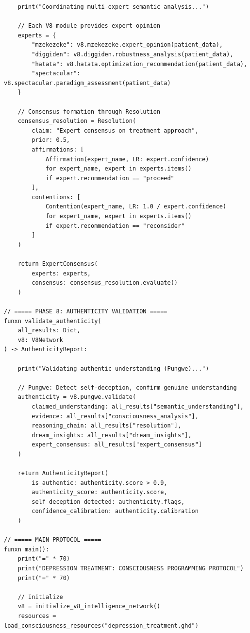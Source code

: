 \begin{verbatim}
    print("Coordinating multi-expert semantic analysis...")
    
    // Each V8 module provides expert opinion
    experts = {
        "mzekezeke": v8.mzekezeke.expert_opinion(patient_data),
        "diggiden": v8.diggiden.robustness_analysis(patient_data),
        "hatata": v8.hatata.optimization_recommendation(patient_data),
        "spectacular": v8.spectacular.paradigm_assessment(patient_data)
    }
    
    // Consensus formation through Resolution
    consensus_resolution = Resolution(
        claim: "Expert consensus on treatment approach",
        prior: 0.5,
        affirmations: [
            Affirmation(expert_name, LR: expert.confidence)
            for expert_name, expert in experts.items()
            if expert.recommendation == "proceed"
        ],
        contentions: [
            Contention(expert_name, LR: 1.0 / expert.confidence)
            for expert_name, expert in experts.items()
            if expert.recommendation == "reconsider"
        ]
    )
    
    return ExpertConsensus(
        experts: experts,
        consensus: consensus_resolution.evaluate()
    )

// ===== PHASE 8: AUTHENTICITY VALIDATION =====
funxn validate_authenticity(
    all_results: Dict,
    v8: V8Network
) -> AuthenticityReport:
    
    print("Validating authentic understanding (Pungwe)...")
    
    // Pungwe: Detect self-deception, confirm genuine understanding
    authenticity = v8.pungwe.validate(
        claimed_understanding: all_results["semantic_understanding"],
        evidence: all_results["consciousness_analysis"],
        reasoning_chain: all_results["resolution"],
        dream_insights: all_results["dream_insights"],
        expert_consensus: all_results["expert_consensus"]
    )
    
    return AuthenticityReport(
        is_authentic: authenticity.score > 0.9,
        authenticity_score: authenticity.score,
        self_deception_detected: authenticity.flags,
        confidence_calibration: authenticity.calibration
    )

// ===== MAIN PROTOCOL =====
funxn main():
    print("=" * 70)
    print("DEPRESSION TREATMENT: CONSCIOUSNESS PROGRAMMING PROTOCOL")
    print("=" * 70)
    
    // Initialize
    v8 = initialize_v8_intelligence_network()
    resources = load_consciousness_resources("depression_treatment.ghd")
    

\end{verbatim}
